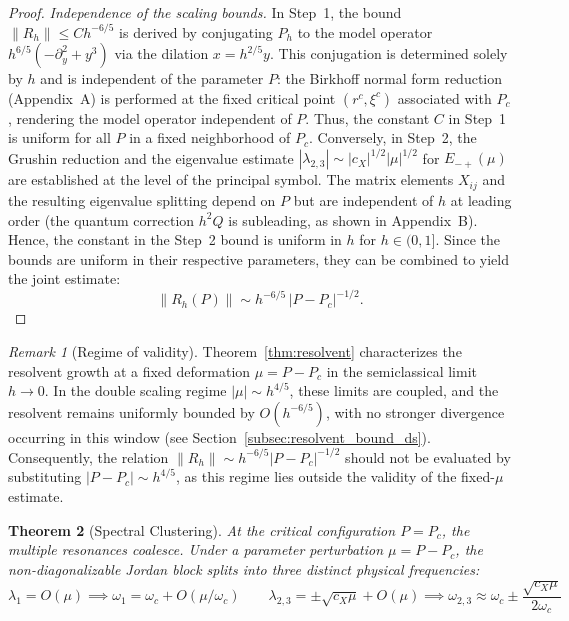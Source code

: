 \documentclass[12pt,a4paper]{amsart}
\newtheorem{theorem}{Theorem}[section]
\theoremstyle{remark}
\newtheorem{remark}[theorem]{Remark}
\begin{document}
\begin{proof}
\emph{Independence of the scaling bounds.}
In Step~1, the bound $\|R_h\| \leq Ch^{-6/5}$ is derived by conjugating
$P_h$ to the model operator $h^{6/5}(-\partial_y^2+y^3)$ via the dilation $x=h^{2/5}y$.
This conjugation is determined solely by $h$ and is independent of the parameter $P$: the Birkhoff normal form
reduction (Appendix~A) is performed at the fixed critical point $(r^c, \xi^c)$
associated with $P_c$, rendering the model operator independent of $P$.
Thus, the constant $C$ in Step~1 is uniform for all $P$ in a fixed
neighborhood of $P_c$.
Conversely, in Step~2, the Grushin reduction and the eigenvalue estimate
$|\lambda_{2,3}|\sim|c_X|^{1/2}|\mu|^{1/2}$ for $E_{-+}(\mu)$ are established
at the level of the principal symbol. The matrix elements $X_{ij}$
and the resulting eigenvalue splitting depend on $P$ but are independent of $h$
at leading order (the quantum correction $h^2 Q$ is subleading, as shown in Appendix~B).
Hence, the constant in the Step~2 bound is uniform in $h$ for $h\in(0,1]$.
Since the bounds are uniform in their respective parameters, they can be combined
to yield the joint estimate:
\[
  \|R_h(P)\| \sim h^{-6/5}\,|P - P_c|^{-1/2}.
\]
\end{proof}

\begin{remark}[Regime of validity]
\label{rem:validity}
Theorem~\ref{thm:resolvent} characterizes the resolvent growth at a fixed
deformation $\mu = P - P_c$ in the semiclassical limit $h \to 0$.
In the double scaling regime $|\mu| \sim h^{4/5}$, these limits are coupled,
and the resolvent remains uniformly bounded by $O(h^{-6/5})$, with no stronger
divergence occurring in this window (see Section~\ref{subsec:resolvent_bound_ds}).
Consequently, the relation $\|R_h\| \sim h^{-6/5}|P-P_c|^{-1/2}$ should not
be evaluated by substituting $|P-P_c| \sim h^{4/5}$, as this regime
lies outside the validity of the fixed-$\mu$ estimate.
\end{remark}

\begin{theorem}[Spectral Clustering]
\label{thm:spectral_clustering}
At the critical configuration $P = P_c$, the multiple resonances coalesce. Under a
parameter perturbation $\mu = P - P_c$, the non-diagonalizable Jordan block splits
into three distinct physical frequencies:
\[
  \lambda_1 = O(\mu) \implies \omega_1 = \omega_c + O(\mu/\omega_c)
  \qquad
  \lambda_{2,3} = \pm\sqrt{c_X\mu} + O(\mu) \implies \omega_{2,3} \approx \omega_c \pm \frac{\sqrt{c_X\mu}}{2\omega_c}
\]
\end{theorem}
\end{document}
